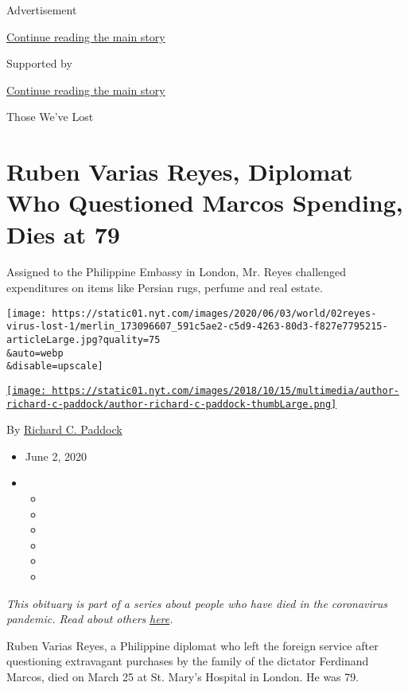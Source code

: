 Advertisement

\protect\hyperlink{after-top}{Continue reading the main story}

Supported by

\protect\hyperlink{after-sponsor}{Continue reading the main story}

Those We've Lost

\hypertarget{ruben-varias-reyes-diplomat-who-questioned-marcos-spending-dies-at-79}{%
\section{Ruben Varias Reyes, Diplomat Who Questioned Marcos Spending,
Dies at
79}\label{ruben-varias-reyes-diplomat-who-questioned-marcos-spending-dies-at-79}}

Assigned to the Philippine Embassy in London, Mr. Reyes challenged
expenditures on items like Persian rugs, perfume and real estate.

\texttt{[image: https://static01.nyt.com/images/2020/06/03/world/02reyes-virus-lost-1/merlin\_173096607\_591c5ae2-c5d9-4263-80d3-f827e7795215-articleLarge.jpg?quality=75\\\&auto=webp\\\&disable=upscale]}

\href{https://www.nytimes.com/by/richard-c-paddock}{\texttt{[image: https://static01.nyt.com/images/2018/10/15/multimedia/author-richard-c-paddock/author-richard-c-paddock-thumbLarge.png]}}

By \href{https://www.nytimes.com/by/richard-c-paddock}{Richard C.
Paddock}

\begin{itemize}
\item
  June 2, 2020
\item
  \begin{itemize}
  \item
  \item
  \item
  \item
  \item
  \item
  \end{itemize}
\end{itemize}

\emph{This obituary is part of a series about people who have died in
the coronavirus pandemic. Read about others}
\href{https://www.nytimes.com/interactive/2020/obituaries/people-died-coronavirus-obituaries.html}{\emph{here}}\emph{.}

Ruben Varias Reyes, a Philippine diplomat who left the foreign service
after questioning extravagant purchases by the family of the dictator
Ferdinand Marcos, died on March 25 at St. Mary's Hospital in London. He
was 79.

